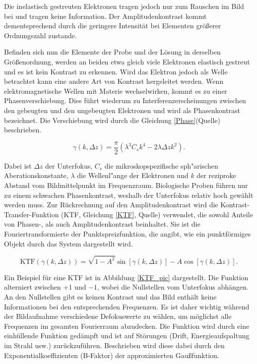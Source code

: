 Die inelastisch gestreuten Elektronen tragen jedoch nur zum Rauschen im Bild bei und tragen keine Information.
Der Amplitudenkontrast kommt dementsprechend durch die geringere Intensität bei Elementen größerer Ordnungszahl zustande.

Befinden sich nun die Elemente der Probe und der Lösung in derselben Größenordnung, werden an beiden etwa gleich viele Elektronen elastisch gestreut und es ist kein Kontrast zu erkennen.
Wird das Elektron jedoch als Welle betrachtet kann eine andere Art von Kontrast hergeleitet werden.
Wenn elektromagnetische Wellen mit Materie wechselwirken, kommt es zu einer Phasenverschiebung.
Dies führt wiederum zu Interferenzerscheinungen zwischen den gebeugten und den ungebeugten Elektronen und wird als Phasenkontrast bezeichnet.
Die Verschiebung wird durch die Gleichung \eqref{Phase}(Quelle) beschrieben.

\begin{equation}
	\gamma(k,\Delta z) = \frac{\pi}{2}\left(\lambda^3 C_s k^4 - 2\lambda \Delta z k^2\right). \label{Phase}
\end{equation}

Dabei ist $\Delta z$ der Unterfokus, $C_s$ die mikroskopspezifische sph"arischen Aberationskonstante, $\lambda$ die Wellenl"ange der Elektronen und $k$ der reziproke Abstand vom Bildmittelpunkt im Frequenzraum.
Biologische Proben führen nur zu einem schwachen Phasenkontrast, weshalb der Unterfokus relativ hoch gewählt werden muss.
Zur Rückrechnung auf den Amplitudenkontrast wird die Kontrast-Transfer-Funktion (KTF, Gleichung \eqref{KTF}, Quelle) verwendet, die sowohl Anteile von Phasen-, als auch Amplitudenkontrast beinhaltet.
Sie ist die Fouriertransformierte der Punktspreizfunktion, die angibt, wie ein punktförmiges Objekt durch das System dargestellt wird.

\begin{equation}
	\text{KTF}(\gamma(k,\Delta z)) = \sqrt{1-A^2} \sin[\gamma(k,\Delta z)] - A \cos[\gamma(k,\Delta z)]. \label{KTF}
\end{equation}

Ein Beispiel für eine KTF ist in Abbildung \ref{KTF_pic} dargestellt.
Die Funktion alterniert zwischen $+1$ und $-1$, wobei die Nullstellen vom Unterfokus abhängen.
An den Nullstellen gibt es keinen Kontrast und das Bild enthält keine Informationen bei den entsprechenden Frequenzen.
Es ist daher wichtig während der Bildaufnahme verschiedene Defokuswerte zu wählen, um möglichst alle Frequenzen im gesamten Fourierraum abzudecken.
Die Funktion wird durch eine einhüllende Funktion gedämpft und ist auf Störungen (Drift, Energieaufspaltung im Strahl usw.) zurückzuführen.
Beschrieben wird diese dabei durch den Exponentialkoeffizienten (B-Faktor) der approximierten Gaußfunktion.

